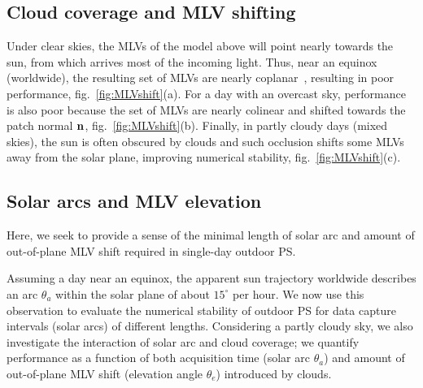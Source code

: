\subsection{Cloud coverage and MLV shifting}
\label{subsec:mlv-clouds}

Under clear skies, the MLVs of the model above will point nearly towards the sun, from which arrives most of the incoming light. Thus, near an equinox (worldwide), the resulting set of MLVs are nearly coplanar~\cite{shen-pg-14}, resulting in poor performance, fig.~\ref{fig:MLVshift}(a). For a day with an overcast sky, performance is also poor because the set of MLVs are nearly colinear and shifted towards the patch normal ${\bf n}$, fig.~\ref{fig:MLVshift}(b). Finally, in partly cloudy days (mixed skies), the sun is often obscured by clouds and such occlusion shifts some MLVs away from the solar plane, improving numerical stability, fig.~\ref{fig:MLVshift}(c). 



\subsection{Solar arcs and MLV elevation}
\label{subsec:solararcs-mlvelevation}


Here, we seek to provide a sense of the minimal length of solar arc and amount of out-of-plane MLV shift required in single-day outdoor PS. 

Assuming a day near an equinox, the apparent sun trajectory worldwide describes an arc $\theta_a$ within the solar plane of about $15^\circ$ per hour. We now use this observation to evaluate the numerical stability of outdoor PS for data capture intervals (solar arcs) of different lengths. Considering a partly cloudy sky, we also investigate the interaction of solar arc and cloud coverage; we quantify performance as a function of both acquisition time (solar arc $\theta_a$) and amount of out-of-plane MLV shift (elevation angle $\theta_e$) introduced by clouds.

